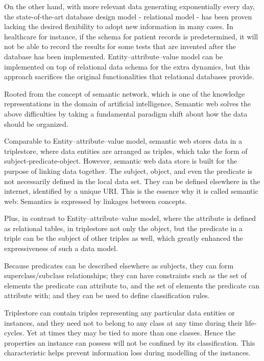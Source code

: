 \documentclass[12pt]{cls}
\begin{document}
On the other hand, with more relevant data generating exponentially every day, the state-of-the-art database design model - relational model - has been proven lacking the desired flexibility to adopt new information in many cases. In healthcare for instance, if the schema for patient records is predetermined, it will not be able to record the results for some tests that are invented after the database has been implemented. Entity–attribute–value model can be implemented on top of relational data schema for the extra dynamics, but this approach sacrifices the original functionalities that relational databases provide.

Rooted from the concept of semantic network, which is one of the knowledge representations in the domain of artificial intelligence, Semantic web solves the above difficulties by taking a fundamental paradigm shift about how the data should be organized.

Comparable to Entity–attribute–value model, semantic web stores data in a triplestore, where data entities are arranged as triples, which take the form of subject-predicate-object. However, semantic web data store is built for the purpose of linking data together. The subject, object, and even the predicate is not necessarily defined in the local data set. They can be defined elsewhere in the internet, identified by a unique URI. This is the essence why it is called semantic web: Semantics is expressed by linkages between concepts.

Plus, in contrast to Entity–attribute–value model, where the attribute is defined as relational tables, in triplestore not only the object, but the predicate in a triple can be the subject of other triples as well, which greatly enhanced the expressiveness of such a data model.

Because predicates can be described elsewhere as subjects, they can form superclass/subclass relationships; they can have constraints such as the set of elements the predicate can attribute to, and the set of elements the predicate can attribute with; and they can be used to define classification rules.

Triplestore can contain triples representing any particular data entities or instances, and they need not to belong to any class at any time during their life-cycles. Yet at times they may be tied to more than one classes. Hence the properties an instance can possess will not be confined by its classification. This characteristic helps prevent information loss during modelling of the instances.
\end{document}
